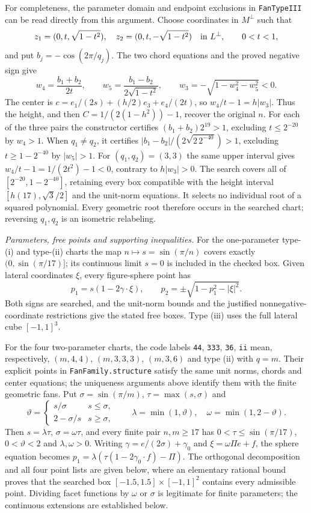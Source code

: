 \documentclass[11pt]{article}
\theoremstyle{definition}
\theoremstyle{remark}
\begin{document}
For completeness, the parameter domain and endpoint exclusions in
\texttt{FanTypeIII} can be read directly from this argument. Choose
coordinates in $M^\perp$ such that
\[
 z_1=(0,t,\sqrt{1-t^2}),\quad
 z_2=(0,t,-\sqrt{1-t^2})\quad\hbox{in }L^\perp,\qquad 0<t<1,
\]
and put $b_j=-\cos(2\pi/q_j)$.
The two chord equations and the proved negative sign give
\[
 w_4=\frac{b_1+b_2}{2t},\qquad
 w_5=\frac{b_1-b_2}{2\sqrt{1-t^2}},\qquad
 w_3=-\sqrt{1-w_4^2-w_5^2}<0.
\]
The center is $c=e_1/(2s)+(h/2)e_3+e_4/(2t)$, so
$w_4/t-1=h|w_3|$. Thus the height, and then
$C=1/(2(1-h^2))-1$, recover the original $n$.
For each of the three pairs the constructor certifies
$(b_1+b_2)2^{19}>1$, excluding $t\le2^{-20}$ by $w_4>1$.
When $q_1\ne q_2$, it certifies
$|b_1-b_2|/(2\sqrt{2\,2^{-40}})>1$, excluding
$t\ge1-2^{-40}$ by $|w_5|>1$.
For $(q_1,q_2)=(3,3)$ the same upper interval gives
$w_4/t-1=1/(2t^2)-1<0$, contrary to $h|w_3|>0$.
The search covers all of $[2^{-20},1-2^{-40}]$, retaining every box
compatible with the height interval $[h(17),\sqrt3/2]$ and the unit-norm
equations. It selects no individual root of a squared polynomial.
Every geometric root therefore occurs in the searched chart;
reversing $q_1,q_2$ is an isometric relabeling.

\emph{Parameters, free points and supporting inequalities.}
For the one-parameter type-(i) and type-(ii) charts the map
$n\mapsto s=\sin(\pi/n)$ covers exactly $(0,\sin(\pi/17)]$;
its continuous limit $s=0$ is included in the checked box.
Given lateral coordinates $\xi$, every figure-sphere point has
\[
 p_1=s(1-2\gamma\cdot\xi),\qquad
 p_2=\pm\sqrt{1-p_1^2-|\xi|^2}.
\]
Both signs are searched, and the unit-norm bounds and the justified
nonnegative-coordinate restrictions give the stated free boxes.
Type (iii) uses the full lateral cube $[-1,1]^3$.

For the four two-parameter charts, the code labels
\texttt{44}, \texttt{333}, \texttt{36}, \texttt{ii} mean, respectively,
$(m,4,4)$, $(m,3,3,3)$, $(m,3,6)$ and type (ii) with $q=m$.
Their explicit points in \texttt{FanFamily.structure} satisfy the same
unit norms, chords and center equations; the uniqueness arguments above
identify them with the finite geometric fans. Put
$\sigma=\sin(\pi/m)$, $\tau=\max(s,\sigma)$ and
\[
 \vartheta=\begin{cases}s/\sigma&s\le\sigma,\\
                         2-\sigma/s&s\ge\sigma,\end{cases}
 \qquad \lambda=\min(1,\vartheta),\quad
 \omega=\min(1,2-\vartheta).
\]
Then $s=\lambda\tau$, $\sigma=\omega\tau$, and every finite pair
$n,m\ge17$ has $0<\tau\le\sin(\pi/17)$, $0<\vartheta<2$ and
$\lambda,\omega>0$. Writing
$\gamma=e/(2\sigma)+\gamma_0$ and
$\xi=\omega\Pi e+f$, the sphere equation becomes
$p_1=\lambda(\tau(1-2\gamma_0\cdot f)-\Pi)$.
The orthogonal decomposition and all four point lists are given below,
where an elementary rational bound proves that the searched box
$[-1.5,1.5]\times[-1,1]^2$ contains every admissible point.
Dividing facet functions by $\omega$ or $\sigma$ is legitimate for
finite parameters; the continuous extensions are established below.
\end{document}
